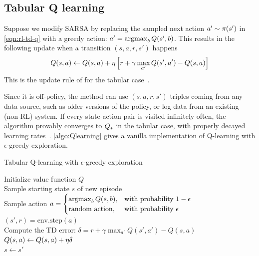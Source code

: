 \subsection{Tabular Q learning}

Suppose we modify SARSA by replacing the sampled next action
$a' \sim \pi(s')$ in \cref{eqn:rl-td-q}
with a greedy action:
$a' = \argmax_b Q(s',b)$.
This results in the following update
when a transition $(s,a,r,s')$ happens
\begin{align}
Q(s,a) \leftarrow Q(s,a) + \eta \left[
  r + \gamma \max_{a'} Q(s',a') - Q(s,a) \right]
\label{eqn:Qlearning}
\end{align}
This is the update rule of 
for the tabular case~\citep{Watkins92}.


Since it is off-policy,
the method can use  $(s,a,r,s')$ triples
coming from any data source,
such as older versions of the policy,
or log data from an existing (non-RL) system.
If every state-action pair is visited infinitely often,
the algorithm provably converges to $Q_{*}$
in the tabular case, with properly decayed learning rates~\citep{BertsekasRL}.
\cref{algo:Qlearning} gives a vanilla implementation of
Q-learning
with $\epsilon$-greedy exploration.

\begin{algorithm}
\dontprintsemicolon
\caption{Tabular Q-learning with $\epsilon$-greedy exploration}
\label{algo:Qlearning}
Initialize value function $Q$ \\
       {
       Sample starting state $s$ of new episode \\
       {
       Sample action
       $a=\begin{cases}
       \argmax_{b} Q(s,b), & \text{with probability $1-\epsilon$} \\
       \text{random action}, & \text{with probability $\epsilon$}
       \end{cases}$
               \\
       $(s',r) = \text{env.step}(a)$ \\
       Compute the TD error: $\delta = r + \gamma \max_{a'} Q(s',a') - Q(s,a)$ \\
       $Q(s,a) \leftarrow Q(s,a) + \eta \delta$ \\
       $s \leftarrow s'$ 
         }
}
\end{algorithm}

